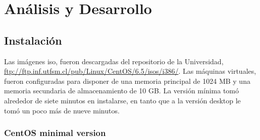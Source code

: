 \documentclass[11pt]{article}
\begin{document}
\section{Análisis y Desarrollo}
\subsection{Instalación}
Las imágenes iso, fueron descargadas del repositorio de la Universidad, \url{ftp://ftp.inf.utfsm.cl/pub/Linux/CentOS/6.5/isos/i386/}. Las máquinas virtuales, fueron configuradas para disponer de una memoria principal de 1024 MB y una memoria secundaria de almacenamiento de 10 GB. La versión mínima tomó alrededor de siete minutos en instalarse, en tanto que a la versión desktop le tomó un poco más de nueve minutos.
	\subsubsection{CentOS minimal version}
\end{document}
